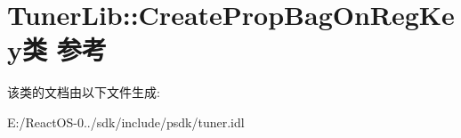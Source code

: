 \hypertarget{class_tuner_lib_1_1_create_prop_bag_on_reg_key}{}\section{Tuner\+Lib\+:\+:Create\+Prop\+Bag\+On\+Reg\+Key类 参考}
\label{class_tuner_lib_1_1_create_prop_bag_on_reg_key}


该类的文档由以下文件生成\+:\begin{DoxyCompactItemize}
\item 
E\+:/\+React\+O\+S-\/0../sdk/include/psdk/tuner.\+idl\end{DoxyCompactItemize}
